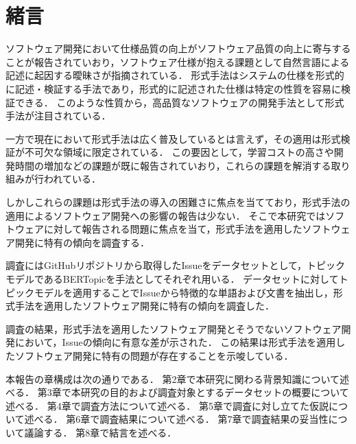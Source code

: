 \documentclass[main]{subfiles}
\begin{document}
\chapter{緒言}

ソフトウェア開発において仕様品質の向上がソフトウェア品質の向上に寄与することが報告されていおり\cite{knauss:2009}，ソフトウェア仕様が抱える課題として自然言語による記述に起因する曖昧さが指摘されている\cite{kamsties:2005}．
形式手法はシステムの仕様を形式的に記述・検証する手法であり，形式的に記述された仕様は特定の性質を容易に検証できる．
このような性質から，高品質なソフトウェアの開発手法として形式手法が注目されている\cite{aoki:2018}．

一方で現在において形式手法は広く普及しているとは言えず，その適用は形式検証が不可欠な領域に限定されている．
この要因として，学習コストの高さや開発時間の増加などの課題が既に報告されていおり\cite{reid:2020,kitamura:2021}，これらの課題を解消する取り組みが行われている\cite{huisman:2020,ohnishi:2020}．

しかしこれらの課題は形式手法の導入の困難さに焦点を当てており，形式手法の適用によるソフトウェア開発への影響の報告は少ない．
そこで本研究ではソフトウェアに対して報告される問題に焦点を当て，形式手法を適用したソフトウェア開発に特有の傾向を調査する．

調査にはGitHubリポジトリから取得したIssueをデータセットとして，トピックモデルであるBERTopic\cite{grootendorst:2022}を手法としてそれぞれ用いる．
データセットに対してトピックモデルを適用することでIssueから特徴的な単語および文書を抽出し，形式手法を適用したソフトウェア開発に特有の傾向を調査した．

調査の結果，形式手法を適用したソフトウェア開発とそうでないソフトウェア開発において，Issueの傾向に有意な差が示された．
この結果は形式手法を適用したソフトウェア開発に特有の問題が存在することを示唆している．

本報告の章構成は次の通りである．
第2章で本研究に関わる背景知識について述べる．
第3章で本研究の目的および調査対象とするデータセットの概要について述べる．
第4章で調査方法について述べる．
第5章で調査に対し立てた仮説について述べる．
第6章で調査結果について述べる．
第7章で調査結果の妥当性について議論する．
第8章で結言を述べる．
\end{document}
